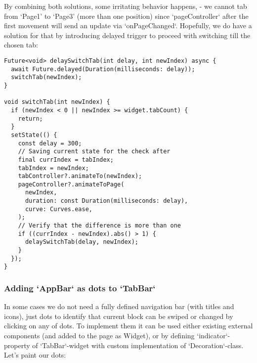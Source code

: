 By combining both solutions, some irritating behavior happens, - we cannot tab from `Page1' to `Page3' 
(more than one position) since `pageController` after the first movement will send an update via `onPageChanged`. 
Hopefully, we do have a solution for that by introducing delayed trigger to proceed with switching till the chosen tab:

\begin{lstlisting}
Future<void> delaySwitchTab(int delay, int newIndex) async {
  await Future.delayed(Duration(milliseconds: delay));
  switchTab(newIndex);
}

void switchTab(int newIndex) {
  if (newIndex < 0 || newIndex >= widget.tabCount) {
    return;
  }
  setState(() {
    const delay = 300;
    // Saving current state for the check after 
    final currIndex = tabIndex;
    tabIndex = newIndex;
    tabController?.animateTo(newIndex);
    pageController?.animateToPage(
      newIndex,
      duration: const Duration(milliseconds: delay),
      curve: Curves.ease,
    );
    // Verify that the difference is more than one
    if ((currIndex - newIndex).abs() > 1) {
      delaySwitchTab(delay, newIndex);
    }
  });
}
\end{lstlisting}


\subsubsection{Adding `AppBar` as dots to `TabBar`}

In some cases we do not need a fully defined navigation bar (with titles and icons), just dots to identify that
current block can be swiped or changed by clicking on any of dots. To implement them it can be used either existing 
external components (and added to the page as Widget), or by defining `indicator`-property of `TabBar`-widget with
custom implementation of `Decoration`-class. Let's paint our dots:

